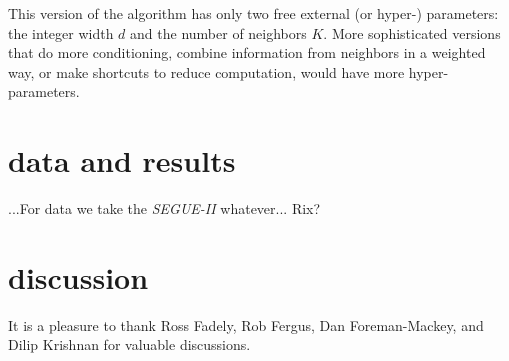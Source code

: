 \documentclass[12pt, preprint]{aastex}
\newcommand{\project}[1]{\textsl{#1}}
\begin{document}
This version of the algorithm has only two free external (or hyper-)
parameters: the integer width $d$ and the number of neighbors $K$.
More sophisticated versions that do more conditioning, combine
information from neighbors in a weighted way, or make shortcuts to
reduce computation, would have more hyper-parameters.

\section{data and results}

...For data we take the \project{SEGUE-II} whatever... Rix?

\section{discussion}

\acknowledgements It is a pleasure to thank
  Ross Fadely,
  Rob Fergus,
  Dan Foreman-Mackey, and
  Dilip Krishnan
for valuable discussions.
\end{document}
